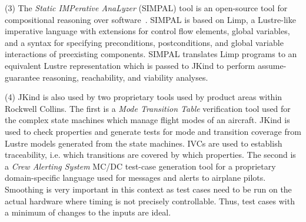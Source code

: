 \documentclass{llncs}
\newcommand{\jkind}{{\sc JKind}\xspace}
\newcommand{\lustre}{{\sc Lustre}\xspace}
\newcommand{\simpal}{{\sc SIMPAL}\xspace}
\newcommand{\limp}{{\sc Limp}\xspace}
\renewcommand{\paragraph}[1]{\vspace{5pt}\noindent {\bf #1}}
\newcommand{\application}[2]{
  \paragraph{#1} \hfill {\it #2}
  \vspace{1pt}
}
\begin{document}
(3) The {\em Static IMPerative AnaLyzer} (\simpal) tool is an
open-source tool for compositional reasoning over
software~\cite{wagner2017spin}. \simpal is based on \limp, a
\lustre-like imperative language with extensions for control flow
elements, global variables, and a syntax for specifying preconditions,
postconditions, and global variable interactions of preexisting
components. \simpal translates \limp programs to an equivalent \lustre
representation which is passed to \jkind to perform assume-guarantee
reasoning, reachability, and viability analyses.

(4) \jkind is also used by two proprietary tools used by product areas
within Rockwell Collins.  The first is a {\em Mode Transition Table}
verification tool used for the complex state machines which manage
flight modes of an aircraft.  \jkind is used to check properties and
generate tests for mode and transition coverage from \lustre models
generated from the state machines.  IVCs are used to establish
traceability, i.e. which transitions are covered by which properties.
The second is a {\em Crew Alerting System} MC/DC test-case generation
tool for a proprietary domain-specific language used for messages and
alerts to airplane pilots.  Smoothing is very important in this
context as test cases need to be run on the actual hardware where
timing is not precisely controllable. Thus, test cases with a minimum
of changes to the inputs are ideal.
%
%


\end{document}
